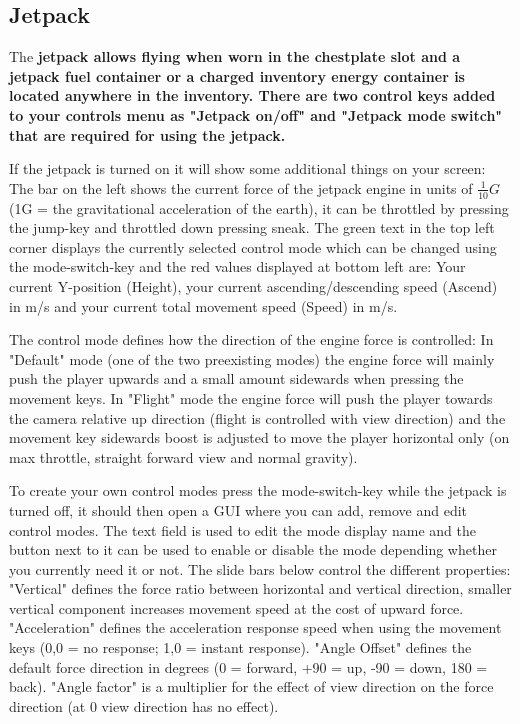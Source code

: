 \documentclass[11pt]{article} %
\begin{document}
\subsection{Jetpack}
The \bf jetpack \rm allows flying when worn in the chestplate slot and a \bf jetpack fuel container \rm or a charged \bf inventory energy container \rm is located anywhere in the inventory. There are two control keys added to your controls menu as "Jetpack on/off" and "Jetpack mode switch" that are required for using the jetpack. 

If the jetpack is turned on it will show some additional things on your screen: The bar on the left shows the current force of the jetpack engine in units of $\frac{1}{10} G$ (1G = the gravitational acceleration of the earth), it can be throttled by pressing the jump-key and throttled down pressing sneak. The green text in the top left corner displays the currently selected control mode which can be changed using the mode-switch-key and the red values displayed at bottom left are: Your current Y-position (Height), your current ascending/descending speed (Ascend) in m/s and your current total movement speed (Speed) in m/s.

The control mode defines how the direction of the engine force is controlled: In "Default" mode (one of the two preexisting modes) the engine force will mainly push the player upwards and a small amount sidewards when pressing the movement keys. In "Flight" mode the engine force will push the player towards the camera relative up direction (flight is controlled with view direction) and the movement key sidewards boost is adjusted to move the player horizontal only (on max throttle, straight forward view and normal gravity). 

To create your own control modes press the mode-switch-key while the jetpack is turned off, it should then open a GUI where you can add, remove and edit control modes. The text field is used to edit the mode display name and the button next to it can be used to enable or disable the mode depending whether you currently need it or not. The slide bars below control the different properties: "Vertical" defines the force ratio between horizontal and vertical direction, smaller vertical component increases movement speed at the cost of upward force. "Acceleration" defines the acceleration response speed when using the movement keys (0,0 = no response; 1,0 = instant response). "Angle Offset" defines the default force direction in degrees (0 = forward, +90 = up, -90 = down, 180 = back). "Angle factor" is a multiplier for the effect of view direction on the force direction (at 0 view direction has no effect).
\end{document}
